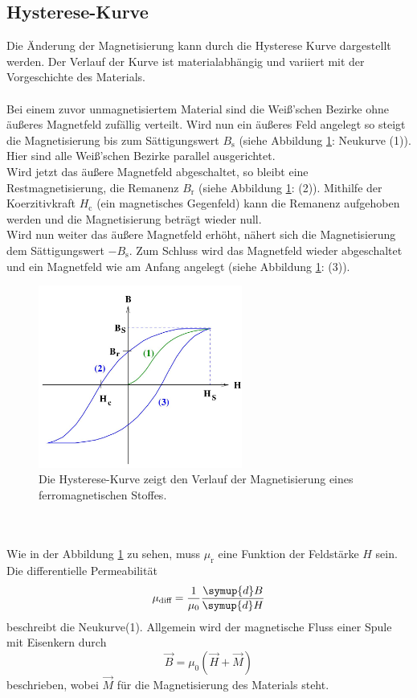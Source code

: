 \subsection{Hysterese-Kurve}
Die Änderung der Magnetisierung kann durch die Hysterese Kurve dargestellt werden. Der Verlauf der Kurve ist materialabhängig und
variiert mit der Vorgeschichte des Materials.\\ \\
Bei einem zuvor unmagnetisiertem Material sind die Weiß'schen Bezirke ohne äußeres Magnetfeld zufällig verteilt. Wird nun ein äußeres Feld angelegt so
steigt die Magnetisierung bis zum Sättigungswert $B_\text{s}$ (siehe Abbildung \ref{fig:hysterese}: Neukurve (1)). Hier sind alle Weiß'schen Bezirke parallel ausgerichtet.\\
Wird jetzt das äußere Magnetfeld abgeschaltet, so bleibt eine Restmagnetisierung, die Remanenz $B_\text{r}$ (siehe Abbildung \ref{fig:hysterese}: (2)).
Mithilfe der Koerzitivkraft $H_\text{c}$ (ein magnetisches Gegenfeld) kann die Remanenz aufgehoben werden und die Magnetisierung beträgt wieder null.\\
Wird nun weiter das äußere Magnetfeld erhöht, nähert sich die Magnetisierung dem Sättigungswert $-B_\text{s}$. Zum Schluss wird das Magnetfeld wieder abgeschaltet und ein Magnetfeld
wie am Anfang angelegt (siehe Abbildung \ref{fig:hysterese}: (3)).
\begin{figure}
    \centering
    \includegraphics[height=6cm]{content/hysterese.jpg}
    \caption{Die Hysterese-Kurve zeigt den Verlauf der Magnetisierung eines ferromagnetischen Stoffes. \cite[3]{anleitung}}
    \label{fig:hysterese}
\end{figure}
\\
\\
Wie in der Abbildung \ref{fig:hysterese} zu sehen, muss $\mu_\text{r}$ eine Funktion der Feldstärke $H$ sein.
Die differentielle Permeabilität
\begin{equation}
    \mu_\text{diff} = \frac{1}{\mu_0} \frac{\symup{d}B}{\symup{d}H}
\end{equation}
beschreibt die Neukurve(1). Allgemein wird der magnetische Fluss einer Spule mit Eisenkern durch
\begin{equation}
    \vec{B} = \mu_0 \left( \vec{H} + \vec{M} \right)
\end{equation}
beschrieben, wobei $\vec{M}$ für die Magnetisierung des Materials steht.